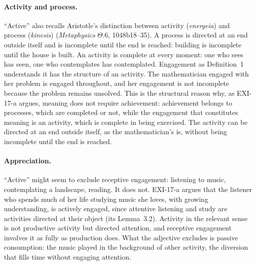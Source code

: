 \paragraph{Activity and process.} \enquote{Active} also recalls Aristotle's distinction between activity (\emph{energeia}) and process (\emph{kinesis}) (\emph{Metaphysics} $\Theta$.6, 1048b18--35). A process is directed at an end outside itself and is incomplete until the end is reached: building is incomplete until the house is built. An activity is complete at every moment: one who sees has seen, one who contemplates has contemplated. Engagement as Definition~1 understands it has the structure of an activity. The mathematician engaged with her problem is engaged throughout, and her engagement is not incomplete because the problem remains unsolved. This is the structural reason why, as EXI-17-a argues, meaning does not require achievement: achievement belongs to processes, which are completed or not, while the engagement that constitutes meaning is an activity, which is complete in being exercised. The activity can be directed at an end outside itself, as the mathematician's is, without being incomplete until the end is reached.

\paragraph{Appreciation.} \enquote{Active} might seem to exclude receptive engagement: listening to music, contemplating a landscape, reading. It does not. EXI-17-a argues that the listener who spends much of her life studying music she loves, with growing understanding, is actively engaged, since attentive listening and study are activities directed at their object (its Lemma~3.2). Activity in the relevant sense is not productive activity but directed attention, and receptive engagement involves it as fully as production does. What the adjective excludes is passive consumption: the music played in the background of other activity, the diversion that fills time without engaging attention.

